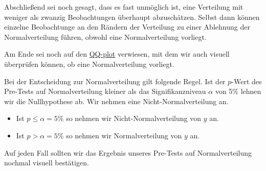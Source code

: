 \documentclass[
  letterpaper,
]{scrbook}
\providecommand{\tightlist}{%
  \setlength{\itemsep}{0pt}\setlength{\parskip}{0pt}}\usepackage{longtable,booktabs,array}
\begin{document}

Abschließend sei noch gesagt, dass es fast unmöglich ist, eine
Verteilung mit weniger als zwanzig Beobachtungen überhaupt abzuschätzen.
Selbst dann können einzelne Beobachtunge an den Rändern der Verteilung
zu einer Ablehnung der Normalverteilung führen, obwohl eine
Normalverteilung vorliegt.

Am Ende sei noch auf den \protect\hyperlink{sec-linreg-qq}{QQ-plot}
verwiesen, mit dem wir auch visuell überprüfen können, ob eine
Normalverteilung vorliegt.

\begin{tcolorbox}[enhanced jigsaw, coltitle=black, titlerule=0mm, bottomrule=.15mm, opacityback=0, opacitybacktitle=0.6, leftrule=.75mm, title=\textcolor{quarto-callout-important-color}{\faExclamation}\hspace{0.5em}{Entscheidung zur Normalverteilung}, toprule=.15mm, bottomtitle=1mm, toptitle=1mm, left=2mm, breakable, arc=.35mm, colback=white, rightrule=.15mm, colbacktitle=quarto-callout-important-color!10!white, colframe=quarto-callout-important-color-frame]
Bei der Entscheidung zur Normalverteilung gilt folgende Regel. Ist der
\(p\)-Wert des Pre-Tests auf Normalverteilung kleiner als das
Signifikanzniveau \(\alpha\) von 5\% lehnen wir die Nullhypothese ab.
Wir nehmen eine Nicht-Normalverteilung an.

\begin{itemize}
\tightlist
\item
  Ist \(p \leq \alpha = 5\%\) so nehmen wir Nicht-Normalverteilung von
  \(y\) an.
\item
  Ist \(p > \alpha = 5\%\) so nehmen wir Normalverteilung von \(y\) an.
\end{itemize}

Auf jeden Fall sollten wir das Ergebnis unseres Pre-Tests auf
Normalverteilung nochmal visuell bestätigen.
\end{tcolorbox}
\end{document}
